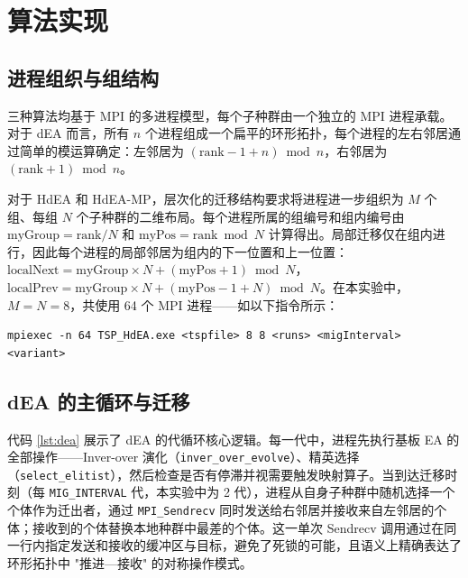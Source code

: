 \section{算法实现}

\subsection{进程组织与组结构}

三种算法均基于 MPI 的多进程模型，每个子种群由一个独立的 MPI 进程承载。对于 dEA 而言，所有 $n$ 个进程组成一个扁平的环形拓扑，每个进程的左右邻居通过简单的模运算确定：左邻居为 $(\text{rank} - 1 + n) \bmod n$，右邻居为 $(\text{rank} + 1) \bmod n$。

对于 HdEA 和 HdEA-MP，层次化的迁移结构要求将进程进一步组织为 $M$ 个组、每组 $N$ 个子种群的二维布局。每个进程所属的组编号和组内编号由 $\text{myGroup} = \text{rank} / N$ 和 $\text{myPos} = \text{rank} \bmod N$ 计算得出。局部迁移仅在组内进行，因此每个进程的局部邻居为组内的下一位置和上一位置：$\text{localNext} = \text{myGroup} \times N + (\text{myPos} + 1) \bmod N$，$\text{localPrev} = \text{myGroup} \times N + (\text{myPos} - 1 + N) \bmod N$。在本实验中，$M = N = 8$，共使用 64 个 MPI 进程——如以下指令所示：

\begin{lstlisting}
mpiexec -n 64 TSP_HdEA.exe <tspfile> 8 8 <runs> <migInterval> <variant>
\end{lstlisting}

\subsection{dEA 的主循环与迁移}

代码 \ref{lst:dea} 展示了 dEA 的代循环核心逻辑。每一代中，进程先执行基板 EA 的全部操作——Inver-over 演化（\texttt{inver\_over\_evolve}）、精英选择（\texttt{select\_elitist}），然后检查是否有停滞并视需要触发映射算子。当到达迁移时刻（每 \texttt{MIG\_INTERVAL} 代，本实验中为 2 代），进程从自身子种群中随机选择一个个体作为迁出者，通过 \texttt{MPI\_Sendrecv} 同时发送给右邻居并接收来自左邻居的个体；接收到的个体替换本地种群中最差的个体。这一单次 Sendrecv 调用通过在同一行内指定发送和接收的缓冲区与目标，避免了死锁的可能，且语义上精确表达了环形拓扑中 "推进—接收" 的对称操作模式。

